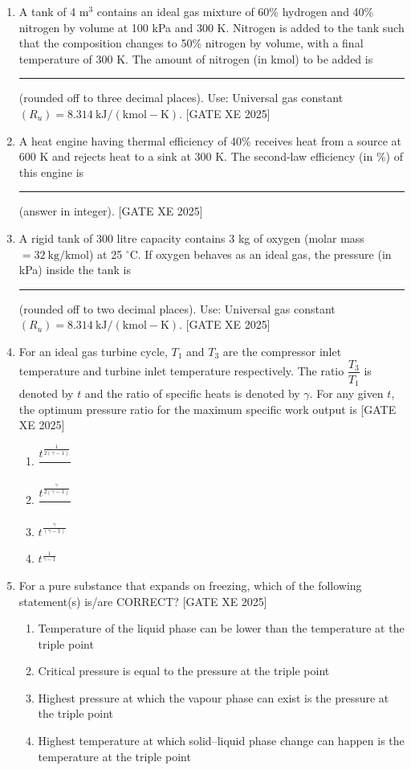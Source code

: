 \documentclass[journal,12pt,onecolumn]{IEEEtran}
\theoremstyle{remark}
\begin{document}
\begin{enumerate}
\item A tank of 4 m$^3$ contains an ideal gas mixture of 60\% hydrogen and 40\% nitrogen by volume at 100 kPa and 300 K. Nitrogen is added to the tank such that the composition changes to 50\% nitrogen by volume, with a final temperature of 300 K. The amount of nitrogen (in kmol) to be added is \rule{3cm}{0.15mm} (rounded off to three decimal places). Use: Universal gas constant $(R_u)=8.314\ \mathrm{kJ/(kmol\!-\!K)}$.
\hfill[GATE XE 2025]

\item A heat engine having thermal efficiency of 40\% receives heat from a source at 600 K and rejects heat to a sink at 300 K. The second-law efficiency (in \%) of this engine is \rule{3cm}{0.15mm} (answer in integer).
\hfill[GATE XE 2025]

\item A rigid tank of 300 litre capacity contains 3 kg of oxygen (molar mass $=32\ \mathrm{kg/kmol}$) at 25 $^\circ$C. If oxygen behaves as an ideal gas, the pressure (in kPa) inside the tank is \rule{3cm}{0.15mm} (rounded off to two decimal places). Use: Universal gas constant $(R_u)=8.314\ \mathrm{kJ/(kmol\!-\!K)}$.
\hfill[GATE XE 2025]

\item For an ideal gas turbine cycle, $T_1$ and $T_3$ are the compressor inlet temperature and turbine inlet temperature respectively. The ratio $\dfrac{T_3}{T_1}$ is denoted by $t$ and the ratio of specific heats is denoted by $\gamma$. For any given $t$, the optimum pressure ratio for the maximum specific work output is
\hfill[GATE XE 2025]
\begin{multicols}{2}
\begin{enumerate}
\item $\dfrac{t^{\frac{1}{2(\gamma-1)}}}{}$
\item $\dfrac{t^{\frac{\gamma}{2(\gamma-1)}}}{}$
\item $t^{\frac{\gamma}{(\gamma-1)}}$
\item $t^{\frac{1}{\gamma-1}}$
\end{enumerate}
\end{multicols}

\item For a pure substance that expands on freezing, which of the following statement(s) is/are CORRECT?
\hfill[GATE XE 2025]
\begin{multicols}{2}
\begin{enumerate}
\item Temperature of the liquid phase can be lower than the temperature at the triple point
\item Critical pressure is equal to the pressure at the triple point
\item Highest pressure at which the vapour phase can exist is the pressure at the triple point
\item Highest temperature at which solid–liquid phase change can happen is the temperature at the triple point
\end{enumerate}
\end{multicols}


\end{enumerate}
\end{document}

